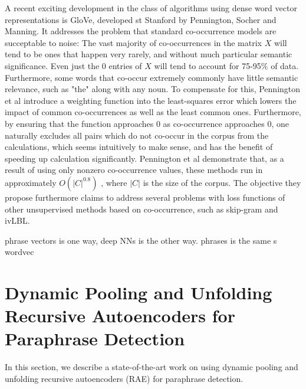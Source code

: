 \documentclass[conference]{IEEEtran}
\begin{document}
A recent exciting development in the class of algorithms using dense word vector representations is GloVe, developed st Stanford by Pennington, Socher and Manning. It addresses the problem that standard co-occurrence models are succeptable to noise: The vast majority of co-occurrences in the matrix $X$ will tend to be ones that happen very rarely, and without much particular semantic significance. Even just the 0 entries of $X$ will tend to account for 75-95\% of data. Furthermore, some words that co-occur extremely commonly have little semantic relevance, such as "the" along with any noun. To compensate for this, Pennington et al introduce a weighting function into the least-squares error which lowers the impact of common co-occurrences as well as the least common ones. Furthermore, by ensuring that the function approaches 0 as co-occurrence approaches 0, one naturally excludes all pairs which do not co-occur in the corpus from the calculations, which seems intuitively to make sense, and has the benefit of speeding up calculation significantly. Pennington et al demonstrate that, as a result of using only nonzero co-occurrence values, these methods run in approximately $O(|C|^{0.8})$ , where $|C|$ is the size of the corpus. The objective they propose furthermore claims to address several problems with loss functions of other unsupervised methods based on co-occurrence, such as skip-gram and ivLBL.


phrase vectors is one way, deep NNs is the other way.
phrases is the same s wordvec


\section{Dynamic Pooling and Unfolding Recursive Autoencoders for Paraphrase Detection}
In this section, we describe a state-of-the-art work \cite{richard} on using dynamic pooling and unfolding recursive autoencoders (RAE) for paraphrase detection.\\
\end{document}
